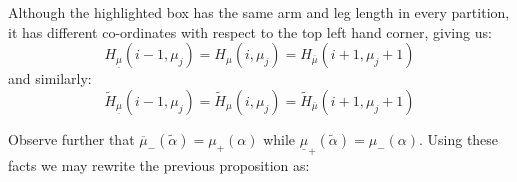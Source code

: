 \documentclass[12pt,dvips]{amsart}
\def\hidehrule#1#2{\kern-#1%
  \hrule height#1 depth#2 \kern-#2 }%
\def\hidevrule#1#2{\kern-#1{\dimen\cellcontent=#1%
    \advance\dimen\cellcontent by#2\vrule width\dimen\cellcontent}\kern-#2 }%
\def\makeblankbox#1#2{\hbox{\lower\dp\cellcontent\vbox{\hidehrule{#1}{#2}%
    \kern-#1 %
    \hbox to \wd\cellcontent{\hidevrule{#1}{#2}%
      \raise\ht\cellcontent\vbox to #1{}%
      \lower\dp\cellcontent\vtop to #1{}%
      \hfil\hidevrule{#2}{#1}}%
    \kern-#1\hidehrule{#2}{#1}}}}
\newcommand\cellify[1]{\defaultcell%
\sbox{\cellcontent}{\vbox to \cellsize{%
\vfill%
\hbox to \cellsize{\hfill$\boxformat #1$\hfill}%
\vfill}}%
\rlap{\drawnbox}%
\usebox{\cellcontent}}%
\newcommand\tableau[1]{\vtop{\let\\\cr
\baselineskip -16000pt \lineskiplimit 16000pt \lineskip 0pt
\ialign{&\cellify{##}\cr#1\crcr}}}
\newcommand\defaultcell{\gdef\drawnbox{%
\makeblankbox{0.2pt}{0.2pt}%
}}
\newcommand\thickcell{\gdef\drawnbox{%
\makeblankbox{0.2pt}{0.1\cellsize}%
}}
\begin{document}

Although the highlighted box has the same arm and leg length in every partition, it has different co-ordinates with respect to the top left hand corner, giving us:
$$ H_{\underline{\mu}}(i-1,\mu_j) = H_\mu(i, \mu_j) = H_{\overline{\mu}}(i+1,\mu_j+1)$$
and similarly:
$$ \tilde{H}_{\underline{\mu}}(i-1,\mu_j) = \tilde{H}_\mu(i, \mu_j) = \tilde{H}_{\overline{\mu}}(i+1,\mu_j+1)$$

\medskip
\noindent
Observe further that $\overline{\mu}_-(\tilde{\alpha}) = \mu_+(\alpha)$ while $\underline{\mu}_+(\tilde{\alpha}) = \mu_-(\alpha)$. Using these facts we may rewrite the previous proposition as:

	
\end{document}
